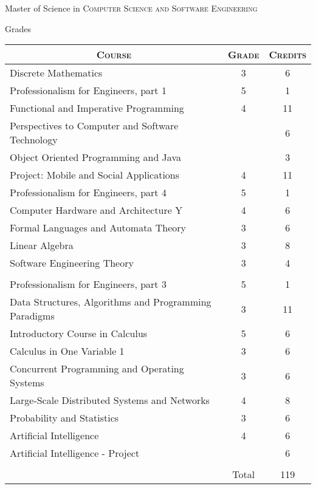 \documentclass[a4paper,10pt]{article}
\begin{document}
\newpage
\par{\centering\Large \hypertarget{grds_liu}{Master of Science in \textsc{Computer Science and Software Engineering}}\par}\large{\centering Grades\par}\normalsize
\begin{center}
\begin{tabular}{lcc}
\multicolumn{1}{c}{\textsc{Course}}&\textsc{Grade}&\textsc{Credits}\\ \hline
Discrete Mathematics	&3&	6\\
Professionalism for Engineers, part 1	&5&	1\\
Functional and Imperative Programming	&4&	11\\
Perspectives to Computer and Software Technology	&&	6\\
Object Oriented Programming and Java && 3\\
Project: Mobile and Social Applications	&4&	11\\
Professionalism for Engineers, part 4	&5	&1\\
Computer Hardware and Architecture Y	&4&	6\\
Formal Languages and Automata Theory	&3&	6\\
Linear Algebra	&3&	8\\
Software Engineering Theory	&3&	4\\ \\
		
Professionalism for Engineers, part 3	&5&	1\\
Data Structures, Algorithms and Programming Paradigms	&3&	11\\
Introductory Course in Calculus	&5&	6\\
Calculus in One Variable 1	&3&	6\\

Concurrent Programming and Operating Systems	&3&	6\\
Large-Scale Distributed Systems and Networks	&4&	8\\
Probability and Statistics	&3&	6\\
Artificial Intelligence &4& 6\\
Artificial Intelligence - Project && 6\\


\\
		
		
    & Total&119\\\cline{2-3}
\end{tabular}
\end{center}
\end{document}
